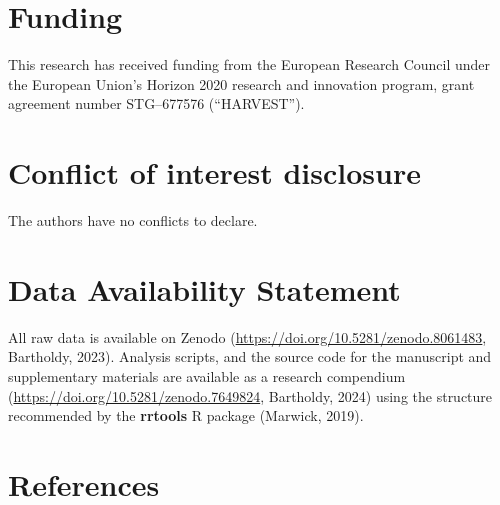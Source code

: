 \documentclass[
]{article}
\begin{document}
\section*{Funding}\label{funding}

This research has received funding from the European Research Council
under the European Union's Horizon 2020 research and innovation program,
grant agreement number STG--677576 (``HARVEST'').

\section*{Conflict of interest
disclosure}\label{conflict-of-interest-disclosure}

The authors have no conflicts to declare.

\section*{Data Availability
Statement}\label{data-availability-statement}

All raw data is available on Zenodo
(\url{https://doi.org/10.5281/zenodo.8061483}, Bartholdy, 2023).
Analysis scripts, and the source code for the manuscript and
supplementary materials are available as a research compendium
(\url{https://doi.org/10.5281/zenodo.7649824}, Bartholdy, 2024) using
the structure recommended by the \textbf{rrtools} R package (Marwick,
2019).

\section*{References}\label{references}
\end{document}

